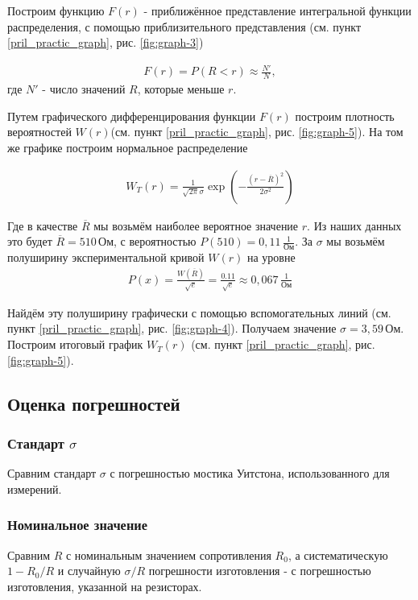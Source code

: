 Построим функцию $F(r)$ - приближённое представление интегральной функции распределения, с помощью приблизительного представления (см. пункт \ref{pril_practic_graph}, рис. \ref{fig:graph-3})

\begin{align}
	F(r) = P(R < r) \approx \frac{N'}{N},
\end{align} 
где $N'$ - число значений $R$, которые меньше $r$.

Путем графического дифференцирования функции $F(r)$ построим плотность вероятностей $W(r)$(см. пункт \ref{pril_practic_graph}, рис. \ref{fig:graph-5}). На том же графике построим нормальное распределение

\begin{align}
	W_T(r) = \frac{1}{\sqrt{2 \pi} \sigma} \exp \left(- \frac{(r - \overline{R})^2}{2 \sigma^2}\right)
\end{align}

Где в качестве $\overline{R}$ мы возьмём наиболее вероятное значение $r$. Из наших данных это будет $\overline{R} = 510\, \text{Ом}$, с вероятностью $P(510) = 0,11 \, \frac{1}{\text{Ом}}$. За $\sigma$ мы возьмём полуширину экспериментальной кривой $W(r)$ на уровне 
\begin{align*}
		P(x) = \frac{W(\overline{R})}{\sqrt{e}} = \frac{0.11}{\sqrt{e}} \approx 0,067\, \frac{1}{\text{Ом}}
\end{align*}

Найдём эту полуширину графически с помощью вспомогательных линий (см. пункт \ref{pril_practic_graph}, рис. \ref{fig:graph-4}). Получаем значение $\sigma = 3,59 \, \text{Ом}$. Построим итоговый график $W_T(r)$ (см. пункт \ref{pril_practic_graph}, рис. \ref{fig:graph-5}). 

\subsection{Оценка погрешностей}

\subsubsection{Стандарт $\sigma$}

Сравним стандарт $\sigma$ с погрешностью мостика Уитстона, использованного для измерений. 

\subsubsection{Номинальное значение}

Сравним $R$ с номинальным значением сопротивления $R_0$, а систематическую $1 - R_0 / R$ и случайную $\sigma / R$ погрешности изготовления - с погрешностью изготовления, указанной на резисторах.


